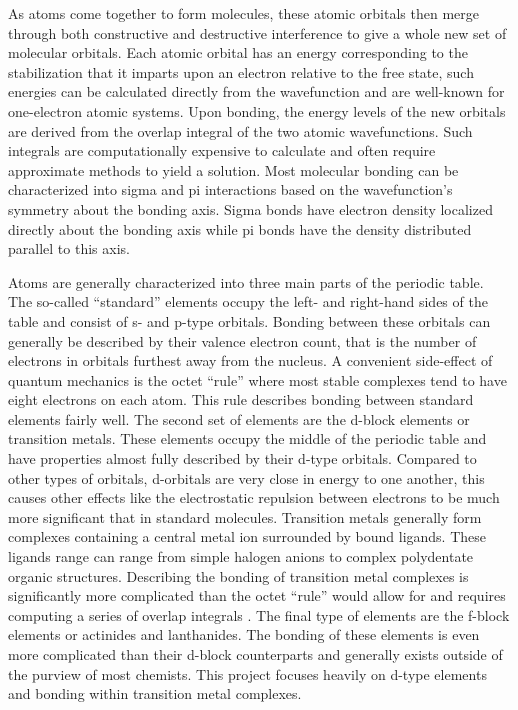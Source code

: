 \documentclass[10pt,twocolumn]{article}
\begin{document}
As atoms come together to form molecules, these atomic orbitals then merge through both constructive and destructive interference to give a whole new set of molecular orbitals. Each atomic orbital has an energy corresponding to the stabilization that it imparts upon an electron relative to the free state, such energies can be calculated directly from the wavefunction and are well-known for one-electron atomic systems. Upon bonding, the energy levels of the new orbitals are derived from the overlap integral of the two atomic wavefunctions. Such integrals are computationally expensive to calculate and often require approximate methods to yield a solution. Most molecular bonding can be characterized into sigma and pi interactions based on the wavefunction’s symmetry about the bonding axis. Sigma bonds have electron density localized directly about the bonding axis while pi bonds have the density distributed parallel to this axis\cite{atkins2014}. 

Atoms are generally characterized into three main parts of the periodic table. The so-called ``standard'' elements occupy the left- and right-hand sides of the table and consist of s- and p-type orbitals. Bonding between these orbitals can generally be described by their valence electron count, that is the number of electrons in orbitals furthest away from the nucleus. A convenient side-effect of quantum mechanics is the octet ``rule'' where most stable complexes tend to have eight electrons on each atom. This rule describes bonding between standard elements fairly well. The second set of elements are the d-block elements or transition metals. These elements occupy the middle of the periodic table and have properties almost fully described by their d-type orbitals. Compared to other types of orbitals, d-orbitals are very close in energy to one another, this causes other effects like the electrostatic repulsion between electrons to be much more significant that in standard molecules. Transition metals generally form complexes containing a central metal ion surrounded by bound ligands. These ligands range can range from simple halogen anions to complex polydentate organic structures. Describing the bonding of transition metal complexes is significantly more complicated than the octet ``rule'' would allow for and requires computing a series of overlap integrals \cite{miessler_inorganic_2014}. The final type of elements are the f-block elements or actinides and lanthanides. The bonding of these elements is even more complicated than their d-block counterparts and generally exists outside of the purview of most chemists. This project focuses heavily on d-type elements and bonding within transition metal complexes.
\end{document}
